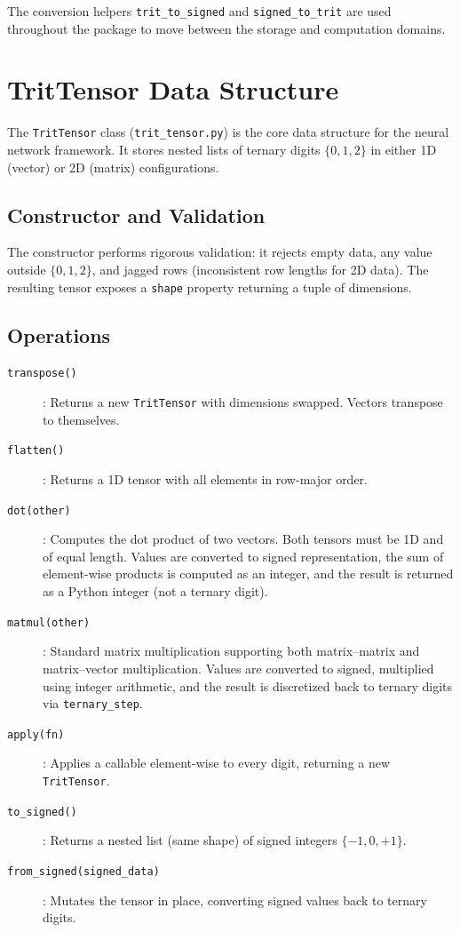 \documentclass[10pt,a4paper,twoside]{book}
\begin{document}
The conversion helpers \texttt{trit\_to\_signed} and
\texttt{signed\_to\_trit} are used throughout the package to move between
the storage and computation domains.

\section{TritTensor Data Structure}

The \texttt{TritTensor} class (\texttt{trit\_tensor.py}) is the core data
structure for the neural network framework. It stores nested lists of
ternary digits $\{0,1,2\}$ in either 1D (vector) or 2D (matrix)
configurations.

\subsection{Constructor and Validation}

The constructor performs rigorous validation: it rejects empty data,
any value outside $\{0,1,2\}$, and jagged rows (inconsistent row lengths
for 2D data). The resulting tensor exposes a \texttt{shape} property
returning a tuple of dimensions.

\subsection{Operations}

\begin{description}
    \item[\texttt{transpose()}]: Returns a new \texttt{TritTensor} with
          dimensions swapped. Vectors transpose to themselves.
    \item[\texttt{flatten()}]: Returns a 1D tensor with all elements in
          row-major order.
    \item[\texttt{dot(other)}]: Computes the dot product of two vectors.
          Both tensors must be 1D and of equal length. Values are converted
          to signed representation, the sum of element-wise products is
          computed as an integer, and the result is returned as a Python
          integer (not a ternary digit).
    \item[\texttt{matmul(other)}]: Standard matrix multiplication supporting
          both matrix--matrix and matrix--vector multiplication. Values
          are converted to signed, multiplied using integer arithmetic,
          and the result is discretized back to ternary digits via
          \texttt{ternary\_step}.
    \item[\texttt{apply(fn)}]: Applies a callable element-wise to every
          digit, returning a new \texttt{TritTensor}.
    \item[\texttt{to\_signed()}]: Returns a nested list (same shape) of
          signed integers $\{-1,0,+1\}$.
    \item[\texttt{from\_signed(signed\_data)}]: Mutates the tensor in
          place, converting signed values back to ternary digits.
\end{description}
\end{document}
